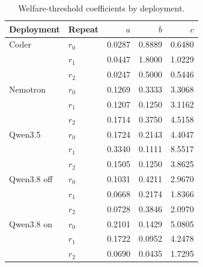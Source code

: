 \begin{table}[t]
\caption{Welfare-threshold coefficients by deployment.}
\label{tab:retail-thresholds}
\centering\small
\begin{tabular}{@{}llrrr@{}}
\toprule
Deployment & Repeat & $a$ & $b$ & $c$ \\
\midrule
Coder & $r_0$ & 0.0287 & 0.8889 & 0.6480 \\
 & $r_1$ & 0.0447 & 1.8000 & 1.0229 \\
 & $r_2$ & 0.0247 & 0.5000 & 0.5446 \\
Nemotron & $r_0$ & 0.1269 & 0.3333 & 3.3068 \\
 & $r_1$ & 0.1207 & 0.1250 & 3.1162 \\
 & $r_2$ & 0.1714 & 0.3750 & 4.5158 \\
Qwen3.5 & $r_0$ & 0.1724 & 0.2143 & 4.4047 \\
 & $r_1$ & 0.3340 & 0.1111 & 8.5517 \\
 & $r_2$ & 0.1505 & 0.1250 & 3.8625 \\
Qwen3.8 off & $r_0$ & 0.1031 & 0.4211 & 2.9670 \\
 & $r_1$ & 0.0668 & 0.2174 & 1.8366 \\
 & $r_2$ & 0.0728 & 0.3846 & 2.0970 \\
Qwen3.8 on & $r_0$ & 0.2101 & 0.1429 & 5.0805 \\
 & $r_1$ & 0.1722 & 0.0952 & 4.2478 \\
 & $r_2$ & 0.0690 & 0.0435 & 1.7295 \\
\bottomrule
\end{tabular}
\end{table}
